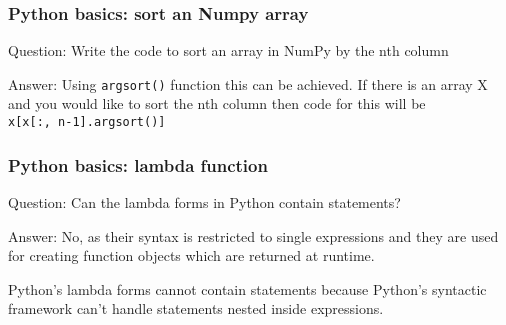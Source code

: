 \documentclass[11pt]{beamer}
\begin{document}
\begin{frame}
\frametitle{Python basics: sort an Numpy array}
\begin{block}{Question:}
	Write the code to sort an array in NumPy by the nth column
\end{block}
\begin{block}{Answer:}
	Using \texttt{argsort()} function this can be achieved. If there is an array X and you would like to sort the nth column then code for this will be \\
	\texttt{x[x[:, n-1].argsort()]}
\end{block}
\end{frame}

\begin{frame}
\frametitle{Python basics: lambda function}
\begin{block}{Question:}
	Can the lambda forms in Python contain statements?
\end{block}
\begin{block}{Answer:}
	No, as their syntax is restricted to single expressions and they are used for creating function objects which are returned at runtime.
	
	Python’s lambda forms cannot contain statements because Python’s syntactic framework can’t handle statements nested inside expressions.
\end{block}
\end{frame}
\end{document}
